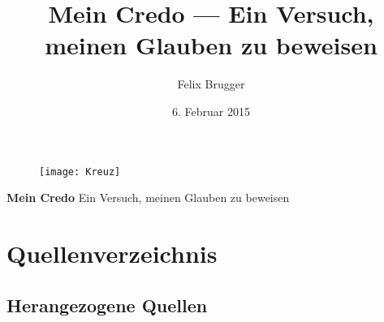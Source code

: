\documentclass[12pt,a4paper]{scrreprt}
\author{Felix Brugger}
\title{Mein Credo --- Ein Versuch, meinen Glauben zu beweisen}
\date{6. Februar 2015}
\begin{document}
\pagestyle{empty}
\begin{figure}[h]
    \begin{center}
        \texttt{[image: Kreuz]}
    \end{center}
\end{figure}

\bigskip
\bigskip
\bigskip

\begin{center}
    \Huge{\textbf{Mein Credo}}
    \linebreak
    \bigskip
    \large{Ein Versuch, meinen Glauben zu beweisen}
\end{center}

\newpage
\pagestyle{scrheadings}
\tableofcontents
\newpage











\iffalse

\fi

\part{Quellenverzeichnis}
\nocite{*}
\chapter{Herangezogene Quellen}
\printbibliography[heading=on, type=online]
\printbibliography[heading=lit, nottype=online, nottype=inproceedings]
\printbibliography[heading=vor, type=inproceedings]
\listoffigures
\end{document}
